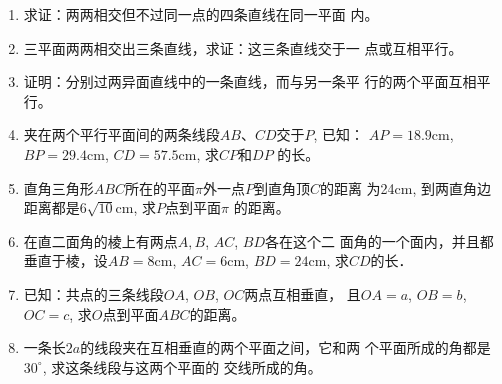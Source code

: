 \begin{enumerate}
\item 求证：两两相交但不过同一点的四条直线在同一平面
内。
\item 三平面两两相交出三条直线，求证：这三条直线交于一
点或互相平行。
\item 证明：分别过两异面直线中的一条直线，而与另一条平
行的两个平面互相平行。
\item 夹在两个平行平面间的两条线段$AB$、$CD$交于$P$, 已知：
$AP=18.9$cm, $BP=29.4$cm, $CD=57.5$cm, 求$CP$和$DP$
的长。
\item 直角三角形$ABC$所在的平面$\pi$外一点$P$到直角顶$C$的距离
为24cm, 到两直角边距离都是$6\sqrt{10}$cm, 求$P$点到平面$\pi$
的距离。
\item 在直二面角的棱上有两点$A,B$, $AC$, $BD$各在这个二
面角的一个面内，并且都垂直于棱，设$AB=8$cm, $AC
=6$cm, $BD=24$cm, 求$CD$的长．
\item 已知：共点的三条线段$OA$, $OB$, $OC$两点互相垂直，
且$OA=a$, $OB=b$, $OC=c$, 求$O$点到平面$ABC$的距离。
\item 一条长$2a$的线段夹在互相垂直的两个平面之间，它和两
个平面所成的角都是$30^{\circ}$, 求这条线段与这两个平面的
交线所成的角。




















\end{enumerate}